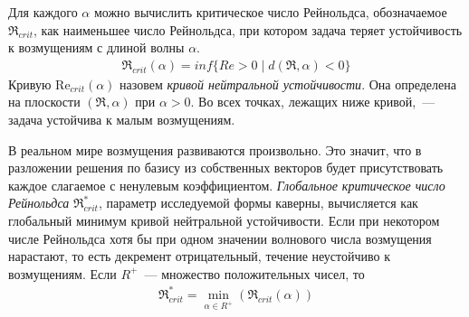 Для каждого $\alpha$ можно вычислить критическое число Рейнольдса, обозначаемое $\Re_{crit}$, как наименьшее число Рейнольдса, при котором задача теряет устойчивость к возмущениям с длиной волны $\alpha$.
\begin{gather}
 \Re_{crit}(\alpha) = inf\{Re>0 \mid d(\Re,\alpha) < 0\}
\end{gather}
Кривую Re$_{crit}(\alpha)$ назовем \textit{кривой нейтральной устойчивости}. Она определена на плоскости $(\Re,\alpha)$ при $\alpha > 0$. Во всех точках, лежащих ниже кривой,~--- задача устойчива к малым возмущениям. 

В реальном мире возмущения развиваются произвольно. Это значит, что в разложении решения по базису из собственных векторов будет присутствовать каждое слагаемое с ненулевым коэффициентом. 
\textit{Глобальное критическое число Рейнольдса} $\Re_{crit}^*$, параметр исследуемой формы каверны, вычисляется как глобальный минимум кривой нейтральной устойчивости. Если при некотором числе Рейнольдса хотя бы при одном значении волнового числа возмущения нарастают, то есть декремент отрицательный, течение неустойчиво к возмущениям. Если $R^+$~--- множество положительных чисел, то
\begin{gather}
 \Re_{crit}^* = \min_{\alpha \in R^+}(\Re_{crit}(\alpha))
\end{gather}


